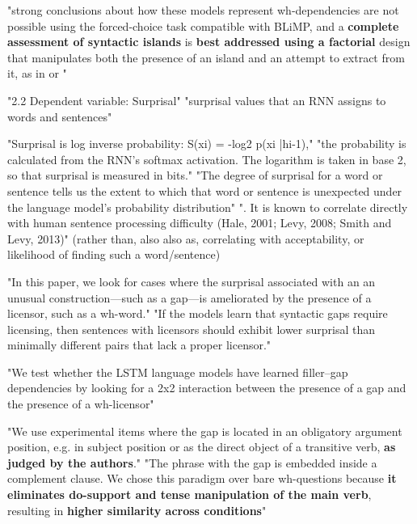 "strong conclusions about how these models represent wh-dependencies are not possible using the forced-choice task compatible with BLiMP, and
a \textbf{complete assessment of syntactic islands} is \textbf{best
	addressed using a factorial} design that manipulates
both the presence of an island and an attempt to
extract from it, as in \citet{kush2018investigating} or  \citet{wilcox2018rnn}" \citep{warstadt2020blimp}

"2.2 Dependent variable: Surprisal" \citep{wilcox2018rnn}
"surprisal values that an RNN assigns to words and sentences" \citep{wilcox2018rnn}

"Surprisal is log inverse probability:
S(xi) = -log2
p(xi
|hi-1)," \citep{wilcox2018rnn}
"the probability is calculated from the RNN’s softmax activation. The logarithm is taken in base 2,
so that surprisal is measured in bits." \citep{wilcox2018rnn}
"The degree of surprisal for a word or sentence
tells us the extent to which that word or sentence
is unexpected under the language model’s probability distribution"
". It is known to correlate directly with human sentence processing difficulty (Hale, 2001; Levy, 2008; Smith and Levy, 2013)" \citep{wilcox2018rnn}
(rather than, also also as, correlating with acceptability, or likelihood of finding such a word/sentence)

"In this paper, we look for cases where the surprisal associated with an an unusual construction—such as a gap—is ameliorated by the presence of a licensor, such as a wh-word." \citep{wilcox2018rnn}
"If the models learn that syntactic gaps require licensing, then sentences with licensors should exhibit lower surprisal than minimally different pairs that lack a proper licensor." \citep{wilcox2018rnn}

"We test whether the LSTM language models have
learned filler–gap dependencies by looking for a
2x2 interaction between the presence of a gap and
the presence of a wh-licensor"

"We use experimental items where the gap is located in an obligatory argument position, e.g. in subject position or as the direct object of a transitive verb, \textbf{as judged by the authors}." \citep{wilcox2018rnn}
"The phrase with the gap is embedded inside a complement clause.  We chose this paradigm over bare wh-questions because \textbf{it eliminates do-support and tense manipulation of the main verb}, resulting in \textbf{higher similarity across conditions}" \citep{wilcox2018rnn}



